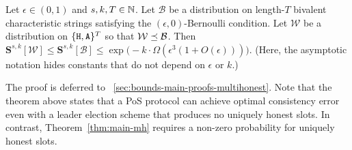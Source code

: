   \begin{theorem}\label{thm:main-mh-bivalent}
    Let $\epsilon \in (0, 1)$ and $s, k, T \in \mathbb{N}$.  
    Let $\mathcal{B}$ be a distribution 
    on length-$T$ bivalent characteristic strings 
    satisfying the $(\epsilon, 0)$-Bernoulli condition. 
    Let 
    $\mathcal{W}$ be a distribution on
    $\{\mathtt{H}, \mathtt{A}\}^T$ so that 
    $\mathcal{W} \preceq \mathcal{B}$. 
    Then 
    $
      \mathbf{S}^{s,k}[\mathcal{W}] 
        \leq \mathbf{S}^{s,k}[\mathcal{B}] 
        \leq 
        \exp\bigl(-k \cdot \Omega(\epsilon^3 (1 + O(\epsilon) ) )\bigr)
    $. 
    (Here, the asymptotic notation hides constants that do not depend on $\epsilon$ or $k$.)
  \end{theorem}

  The proof is deferred to \Section~\ref{sec:bounds-main-proofs-multihonest}.
  Note that the theorem above states that a 
  PoS protocol can achieve optimal consistency error 
  even with a leader election scheme 
  that produces no uniquely honest slots. 
  In contrast, Theorem~\ref{thm:main-mh} requires 
  a non-zero probability for uniquely honest slots.

